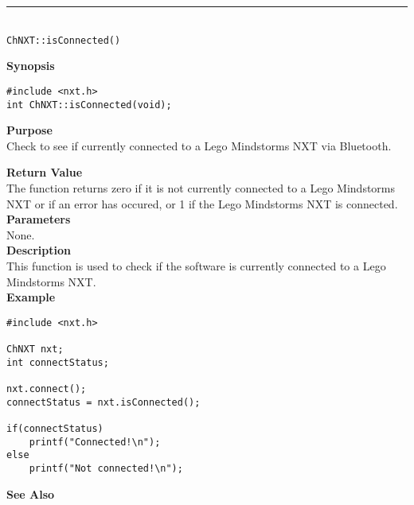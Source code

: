 \noindent
\vspace{5pt}
\rule{4.5in}{0.015in}\\
\noindent
{\LARGE \texttt{ChNXT::isConnected()} }\\


\noindent
{\bf Synopsis}
\begin{lstlisting}
#include <nxt.h>
int ChNXT::isConnected(void);
\end{lstlisting}

\noindent
{\bf Purpose}\\
Check to see if currently connected to a Lego Mindstorms NXT via Bluetooth.

\noindent
{\bf Return Value}\\
The function returns zero if it is not currently connected to a Lego Mindstorms NXT or if an error has occured, or 1 if the Lego Mindstorms NXT is connected.\\

\noindent
{\bf Parameters}\\
None.\\

\noindent
{\bf Description}\\
This function is used to check if the software is currently connected to a Lego Mindstorms NXT.\\

\noindent
{\bf Example}
\begin{lstlisting}
#include <nxt.h>

ChNXT nxt;
int connectStatus;

nxt.connect();
connectStatus = nxt.isConnected();

if(connectStatus)
    printf("Connected!\n");
else
    printf("Not connected!\n");
\end{lstlisting}

\noindent
{\bf See Also}\\
